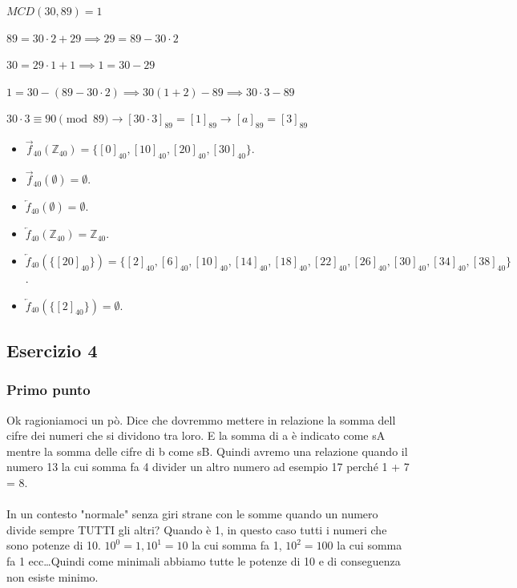 \vspace{1em}

$MCD(30,89) = 1$

\vspace{1em}

$89 = 30 \cdot 2 + 29 \implies 29 = 89 - 30 \cdot 2$

$30 = 29 \cdot 1 + 1 \implies 1 = 30 - 29$

$1 = 30 - (89 - 30 \cdot 2) \implies 30(1+2) - 89 \implies 30 \cdot 3 - 89$

$30 \cdot 3 \equiv 90 \pmod{89} \rightarrow [30 \cdot 3]_{89} = [1]_{89} \rightarrow [a]_{89} = [3]_{89}$

\begin{itemize}
    \item $\vec{f}_{40}(\mathbb{Z}_{40}) = \{[0]_{40}, [10]_{40}, [20]_{40}, [30]_{40}\}$.
    \item $\vec{f}_{40}(\emptyset) = \emptyset$.
    \item $\overleftarrow{f}_{40}(\emptyset) = \emptyset$.
    \item $\overleftarrow{f}_{40}(\mathbb{Z}_{40}) = \mathbb{Z}_{40}$.
    \item $\overleftarrow{f}_{40}(\{[20]_{40}\}) = \{[2]_{40}, [6]_{40}, [10]_{40}, [14]_{40}, [18]_{40}, [22]_{40}, [26]_{40}, [30]_{40}, [34]_{40}, [38]_{40}\}$.
    \item $\overleftarrow{f}_{40}(\{[2]_{40}\}) = \emptyset$.
\end{itemize}

\subsection*{Esercizio 4}

\subsubsection*{Primo punto}

Ok ragioniamoci un pò. Dice che dovremmo mettere in relazione la somma dell cifre dei numeri che si dividono tra loro. E
la somma di a è indicato come sA mentre la somma delle cifre di b come sB. Quindi avremo una relazione quando il numero
13 la cui somma fa 4 divider un altro numero ad esempio 17 perché 1 + 7 = 8. \\ \\ 

In un contesto "normale" senza giri strane con le somme quando un numero divide sempre TUTTI gli altri? Quando è 1, in questo
caso tutti i numeri che sono potenze di 10. $10^0 = 1, 10^1 = 10$ la cui somma fa 1, $10^2 = 100$ la cui somma fa 1 ecc\dots Quindi come
minimali abbiamo tutte le potenze di 10 e di conseguenza non esiste minimo. \\ \\

